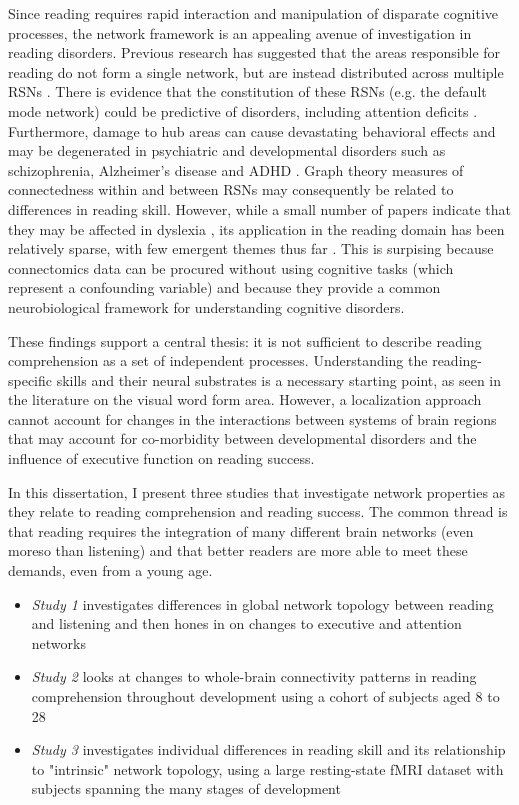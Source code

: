 Since reading requires rapid interaction and manipulation of disparate cognitive processes, the network framework is an appealing avenue of investigation in reading disorders. Previous research has suggested that the areas responsible for reading do not form a single network, but are instead distributed across multiple RSNs \cite{Vogel2013}. There is evidence that the constitution of these RSNs (e.g. the default mode network) could be predictive of disorders, including attention deficits \cite{Uddin2008}. Furthermore, damage to hub areas can cause devastating behavioral effects \cite{Warren2014} and may be degenerated in psychiatric and developmental disorders such as schizophrenia, Alzheimer's disease and ADHD \cite{Stam2014}. Graph theory measures of connectedness within and between RSNs may consequently be related to differences in reading skill. However, while a small number of papers indicate that they may be affected in dyslexia \cite{Qi2016, Finn2014}, its application in the reading domain has been relatively sparse, with few emergent themes thus far \cite{Cao2016}. This is surpising because connectomics data can be procured without using cognitive tasks (which represent a confounding variable) and because they provide a common neurobiological framework for understanding cognitive disorders.

These findings support a central thesis: it is not sufficient to describe reading comprehension as a set of independent processes. Understanding the reading-specific skills and their neural substrates is a necessary starting point, as seen in the literature on the visual word form area. However, a localization approach cannot account for changes in the interactions between systems of brain regions that may account for co-morbidity between developmental disorders and the influence of executive function on reading success.

In this dissertation, I present three studies that investigate network properties as they relate to reading comprehension and reading success. The common thread is that reading requires the integration of many different brain networks (even moreso than listening) and that better readers are more able to meet these demands, even from a young age.

\begin{itemize}
    \item \textit{Study 1} investigates differences in global network topology between reading and listening and then hones in on changes to executive and attention networks 
    \item \textit{Study 2} looks at changes to whole-brain connectivity patterns in reading comprehension throughout development using a cohort of subjects aged 8 to 28
    \item \textit{Study 3} investigates individual differences in reading skill and its relationship to "intrinsic" network topology, using a large resting-state fMRI dataset with subjects spanning the many stages of development
\end{itemize}

